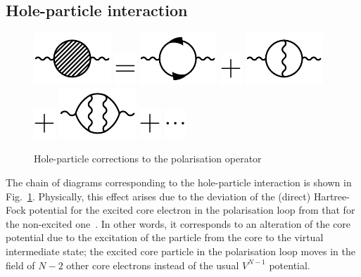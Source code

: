 \documentclass[10pt,twocolumn,a4paper]{article}%
\begin{document}
\subsection{Hole-particle interaction}


\begin{figure}%
\centering
\includegraphics[height=0.045\textwidth]{img/Sigma/polAll}
\includegraphics[height=0.045\textwidth]{img/Sigma/equals}
\includegraphics[height=0.045\textwidth]{img/Sigma/pol0}
\includegraphics[height=0.045\textwidth]{img/Sigma/plus}
\includegraphics[height=0.045\textwidth]{img/Sigma/pol1}
\includegraphics[height=0.045\textwidth]{img/Sigma/plus}
\includegraphics[height=0.045\textwidth]{img/Sigma/pol2}
\includegraphics[height=0.045\textwidth]{img/Sigma/plus}
\includegraphics[height=0.045\textwidth]{img/Sigma/dotdotdot}
\caption{\label{fig:HoleParticle}\small Hole-particle corrections to the polarisation operator}
\end{figure}




The chain of diagrams corresponding to the hole-particle interaction is shown in Fig.~\ref{fig:HoleParticle}.
Physically, this effect arises due to the
deviation of the (direct) Hartree-Fock potential for the excited core electron in the polarisation loop from that for the non-excited one~\cite{DzubaCPM1989plaEn}.
In other words, it corresponds to an alteration of the core potential due to the excitation of the particle from the core to the virtual intermediate state; the excited core particle in the polarisation loop moves in the field of $N-2$ other core electrons instead of the usual $V^{N-1}$ potential.
\end{document}
